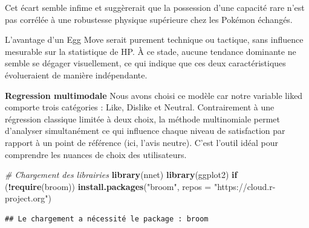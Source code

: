\documentclass[mstat,12pt]{unswthesis}
\newenvironment{Shaded}{\begin{snugshade}}{\end{snugshade}}
\newcommand{\AttributeTok}[1]{\textcolor[rgb]{0.13,0.29,0.53}{#1}}
\newcommand{\CommentTok}[1]{\textcolor[rgb]{0.56,0.35,0.01}{\textit{#1}}}
\newcommand{\ControlFlowTok}[1]{\textcolor[rgb]{0.13,0.29,0.53}{\textbf{#1}}}
\newcommand{\FunctionTok}[1]{\textcolor[rgb]{0.13,0.29,0.53}{\textbf{#1}}}
\newcommand{\NormalTok}[1]{#1}
\newcommand{\SpecialCharTok}[1]{\textcolor[rgb]{0.81,0.36,0.00}{\textbf{#1}}}
\newcommand{\StringTok}[1]{\textcolor[rgb]{0.31,0.60,0.02}{#1}}
\begin{document}
Cet écart semble infime et suggèrerait que la possession d'une capacité
rare n'est pas corrélée à une robustesse physique supérieure chez les
Pokémon échangés.

L'avantage d'un Egg Move serait purement technique ou tactique, sans
influence mesurable sur la statistique de HP. À ce stade, aucune
tendance dominante ne semble se dégager visuellement, ce qui indique que
ces deux caractéristiques évolueraient de manière indépendante.

\bigskip

\textbf{Regression multimodale} Nous avons choisi ce modèle car notre
variable liked comporte trois catégories : Like, Dislike et Neutral.
Contrairement à une régression classique limitée à deux choix, la
méthode multinomiale permet d'analyser simultanément ce qui influence
chaque niveau de satisfaction par rapport à un point de référence (ici,
l'avis neutre). C'est l'outil idéal pour comprendre les nuances de choix
des utilisateurs.

\begin{Shaded}
\begin{Highlighting}[]
\CommentTok{\# Chargement des librairies}
\FunctionTok{library}\NormalTok{(nnet)}
\FunctionTok{library}\NormalTok{(ggplot2)}
\ControlFlowTok{if}\NormalTok{ (}\SpecialCharTok{!}\FunctionTok{require}\NormalTok{(broom)) }\FunctionTok{install.packages}\NormalTok{(}\StringTok{"broom"}\NormalTok{, }\AttributeTok{repos =} \StringTok{"https://cloud.r{-}project.org"}\NormalTok{)}
\end{Highlighting}
\end{Shaded}

\begin{verbatim}
## Le chargement a nécessité le package : broom
\end{verbatim}
\end{document}
